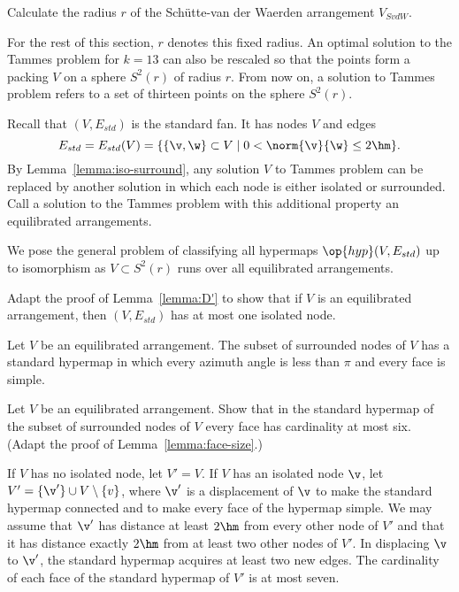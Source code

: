 \begin{exer}
Calculate the radius $r$ of the Sch\"utte-van der Waerden arrangement $V_{SvdW}$.
\end{exer}

For the rest of this section, $r$ denotes this fixed radius.  An
optimal solution to the Tammes problem for $k=13$ can also be rescaled
so that the points form a packing $V$ on a sphere $S^2(r)$ of radius
$r$.  From now on, a solution to Tammes problem  refers to a set of
thirteen  points on the sphere $S^2(r)$.

Recall that $(V,E_{std})$ is the standard fan.  It has nodes $V$ and edges
\[
E_{std} = E_{std}(V) = \{\{\v,\w\}\subset V\mid 0 <
\norm{\v}{\w} \le 2\hm\}.
\]
By Lemma~\ref{lemma:iso-surround}, any solution $V$ to Tammes problem
can be replaced by another solution in which each node is either
isolated or surrounded.  Call a solution to the Tammes problem
with this additional property an equilibrated arrangements.


We pose the general problem of classifying
all hypermaps $\op{hyp}(V,E_{std})$ up to isomorphism as $V\subset
S^2(r)$ runs over all equilibrated arrangements.

\begin{exer}
  Adapt the proof of Lemma~\ref{lemma:D'} to show that if $V$ is an
  equilibrated arrangement, then $(V,E_{std})$ has at most one
  isolated node.
\end{exer}

Let $V$ be an equilibrated arrangement.   The subset
of surrounded nodes of $V$ has a standard hypermap in which every
azimuth angle is less than $\pi$ and every face is simple.

\begin{exer} 
  Let $V$ be an equilibrated arrangement.  Show that in the standard
  hypermap of the subset of surrounded nodes of $V$ every face has
  cardinality at most six.  (Adapt the proof of
  Lemma~\ref{lemma:face-size}.)
\end{exer}

If $V$ has no isolated node, let $V'=V$.  If $V$ has an isolated node
$\v$, let $V' = \{\v'\}\cup V\setminus\{v\}$, where $\v'$ is a
displacement of $\v$ to make the standard hypermap connected and to
make every face of the hypermap simple.  We may assume that $\v'$ has
distance  at least $2\hm$ from every other node of $V'$ and that it
has distance  exactly $2\hm$ from at least two other nodes of $V'$.  In
displacing $\v$ to $\v'$, the standard hypermap acquires at least two
new edges.  The cardinality of each face of the standard hypermap of
$V'$ is at most seven.


